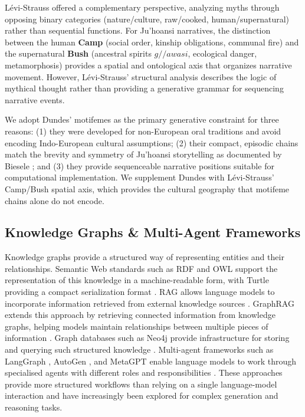 \documentclass[pdflatex,sn-mathphys-num]{sn-jnl}%
\newcommand{\juhoansi}{\mbox{Ju\textbar{}'hoansi}}%
\theoremstyle{thmstyleone}%
\theoremstyle{thmstyletwo}%
\theoremstyle{thmstylethree}%
\begin{document}
Lévi-Strauss \cite{levistrauss1955structural} offered a complementary perspective, analyzing myths through opposing binary categories (nature/culture, raw/cooked, human/supernatural) rather than sequential functions. For \juhoansi{} narratives, the distinction between the human \textbf{Camp} (social order, kinship obligations, communal fire) and the supernatural \textbf{Bush} (ancestral spirits $g//awasi$, ecological danger, metamorphosis) provides a spatial and ontological axis that organizes narrative movement. However, Lévi-Strauss' structural analysis describes the logic of mythical thought rather than providing a generative grammar for sequencing narrative events.

We adopt Dundes' motifemes as the primary generative constraint for three reasons: (1) they were developed for non-European oral traditions and avoid encoding Indo-European cultural assumptions; (2) their compact, episodic chains match the brevity and symmetry of \juhoansi{} storytelling as documented by Biesele \cite{biesele2006ju}; and (3) they provide sequenceable narrative positions suitable for computational implementation. We supplement Dundes with Lévi-Strauss' Camp/Bush spatial axis, which provides the cultural geography that motifeme chains alone do not encode.

\subsection{Knowledge Graphs \& Multi-Agent Frameworks}

Knowledge graphs provide a structured way of representing entities and their relationships. Semantic Web standards such as RDF and OWL support the representation of this knowledge in a machine-readable form, with Turtle providing a compact serialization format \cite{w3c2014rdfconcepts,w3c2014turtle,w3c2012owl2}. RAG allows language models to incorporate information retrieved from external knowledge sources \cite{lewis2020retrieval}. GraphRAG extends this approach by retrieving connected information from knowledge graphs, helping models maintain relationships between multiple pieces of information \cite{edge2024graphrag}. Graph databases such as Neo4j provide infrastructure for storing and querying such structured knowledge \cite{clemedtson2025graphraft}. Multi-agent frameworks such as LangGraph \cite{langchain2024langgraph}, AutoGen \cite{wu2023autogen}, and MetaGPT \cite{hong2023metagpt} enable language models to work through specialised agents with different roles and responsibilities \cite{wu2023autogen,hong2023metagpt}. These approaches provide more structured workflows than relying on a single language-model interaction and have increasingly been explored for complex generation and reasoning tasks.
\medskip
\end{document}
